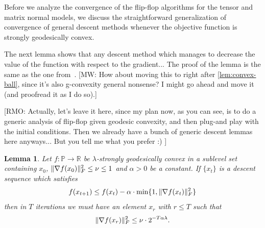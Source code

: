 \documentclass[aos]{imsart}
\newtheorem{lemma}[theorem]{Lemma}
\theoremstyle{definition}
\numberwithin{equation}{section}
\DeclarePairedDelimiter{\norm}{\lVert}{\rVert}
\newcommand{\R}{{\mathbb{R}}}
\newcommand{\SPD}{\mathbb{P}}
\newcommand{\RMO}[1]{{\color{red}[RMO: #1]}}
\newcommand{\MW}[1]{{\color{red}[MW: #1]}}
\begin{document}
Before we analyze the convergence of the flip-flop algorithms for the tensor and matrix normal models, we discuss the straightforward generalization of convergence of general descent methods whenever the objective function is strongly geodesically convex.

The next lemma shows that any descent method which manages to decrease the value of the function with respect to the gradient...
The proof of the lemma is the same as the one from~\cite[Lemma 4.8]{FM20}.
\MW{How about moving this to right after \cref{lem:convex-ball}, since it's also g-convexity general nonsense? I might go ahead and move it (and proofread it as I do so).}

\RMO{Actually, let's leave it here, since my plan now, as you can see, is to do a generic analysis of flip-flop given geodesic convexity, and then plug-and play with the initial conditions. Then we already have a bunch of generic descent lemmas here anyways... But you tell me what you prefer :)  }

\begin{lemma}\label{lem:descent-sublevel-set}
	Let $f : \SPD \rightarrow \R$ be $\lambda$-strongly geodesically convex in a sublevel set containing $x_0$, $\norm{\nabla f(x_0)}_F^2 \leq \nu \leq 1$ and $\alpha > 0$ be a constant.
	If $\{x_t\}$ is a descent sequence which satisfies
	$$ f(x_{t+1}) \leq f(x_t) - \alpha \cdot \min\{1,  \norm{\nabla f(x_t)}^2_F \} $$
	then in $T$ iterations we must have an element $x_r$ with $r \leq T$ such that
	$$ \norm{\nabla f(x_r)}^2_F \leq \nu \cdot 2^{- T \alpha \lambda}.   $$
\end{lemma}
\end{document}
